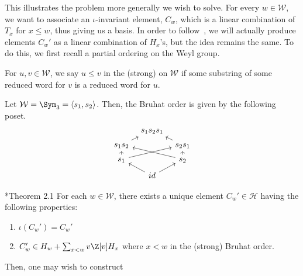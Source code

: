 \documentclass[11pt,leqno,oneside]{amsart}
\numberwithin{thm}{section}
\renewcommand{\W}{\mathcal{W}}
\renewcommand{\H}{\mathcal{H}} %
\begin{document}
 This illustrates the problem more generally we wish to solve. For
 every \(w \in \W\), we want to associate an \(\iota\)-invariant
 element, \(C_w\), which is a linear combination of \(T_x\) for \(x
 \leq w\), thus giving us a basis. In order to follow~\cite{soergel},
 we will actually produce elements \(C_w'\) as a linear combination of
 \(H_x\)'s, but the idea remains the same. To do this, we first recall
 a partial ordering on the Weyl group.
 \begin{defn}
   For \(u,v \in \W\), we say \(u \leq v\) in the (strong)  on \(\W\) if some substring of some reduced word
   for \(v\) is a reduced word for \(u\).
 \end{defn}
 \begin{example}
   Let \(\W = \Sym_3 = \langle s_1, s_2 \rangle\). Then, the Bruhat
   order is given by the following poset. \[
     \begin{tikzcd}[row sep=tiny, column sep=tiny]
       & s_1s_2s_1 & \\
       s_1 s_2 \ar[ur] & & s_2 s_1 \ar[ul]\\
       s_1 \ar[u] \ar[urr]& & s_2 \ar[u] \ar[ull]\\
       & id \ar[ul] \ar[ur]&
     \end{tikzcd}
   \]
 \end{example}
\begin{thm}\label{thm:KL}
  \cite{soergel}*{Theorem 2.1} For each \(w \in \W\), there exists a
  unique element \(C_w' \in \H\) having the following properties:
  \begin{enumerate}
  \item \(\iota(C_w') = C_w'\) 
  \item \(C_w' \in H_w + \sum_{x < w} v \Z[v] H_x\) where \(x < w\) in
    the (strong) Bruhat order.
  \end{enumerate}
\end{thm}
Then, one may wish to construct 
\end{document}
